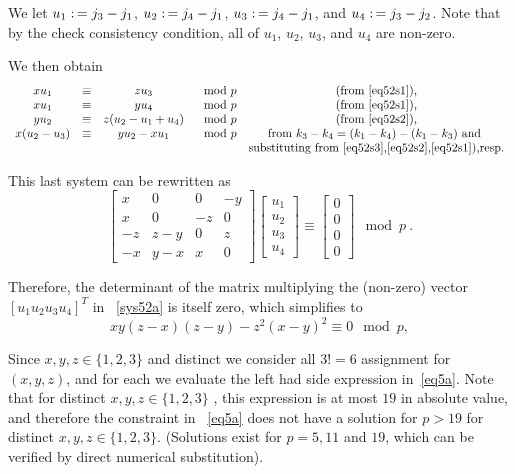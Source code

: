  We let $u_1 \asn j_3 -j_1$, $u_2\asn j_4 -j_1$, $u_3 \asn j_4
-j_1$, and $u_4 \asn j_3 -j_2$. Note that by the check consistency
condition, all of $u_1$, $u_2$, $u_3$, and $u_4$ are non-zero.

We then obtain
\begin{equation}\begin{array}{cccccc}
xu_1 &\equiv& zu_3 & \mod p & \text{(from \eqref{eq52s1}),} \\xu_1
&\equiv& yu_4 & \mod p & \text{(from \eqref{eq52s1}),}\\
yu_2 &\equiv& z(u_2-u_1+u_4)& \mod p & \text{(from \eqref{eq52s2}),}
\\x(u_2-u_3)
&\equiv& yu_2-xu_1 & \mod p & \text{from
$k_3-k_4=(k_1-k_4)-(k_1-k_3)$ and }\\{}&{}&{}&{}& \text{substituting
from \eqref{eq52s3},\eqref{eq52s2},\eqref{eq52s1}),resp.}
\end{array}\end{equation}

This last system can be rewritten as
\begin{equation}\label{sys52a}
\left[ \begin{array}{ccccccc} x & 0 & 0 & -y\\
x & 0 & -z &0\\
-z & z-y &0 & z\\
-x & y-x & x & 0
\end{array}\right] \left[\begin{array}{c}
u_1\\u_2\\u_3\\u_4 \end{array}\right] \equiv
\left[\begin{array}{c}0\\0\\0\\0\end{array}\right] \mod p~.
\end{equation}

Therefore, the determinant of the matrix multiplying the (non-zero)
vector $\left[u_1 u_2 u_3 u_4\right]^{T}$ in ~\eqref{sys52a} is
itself zero, which simplifies to
\begin{equation}\label{eq5a}
xy(z-x)(z-y)-z^2(x-y)^2 \equiv 0 \mod p,
\end{equation}

Since $x,y,z \in \{1,2,3\}$ and distinct we consider all $3!=6$
assignment for $(x,y,z)$, and for each we evaluate the left had side
expression in~\eqref{eq5a}. Note that for distinct $x,y,z \in
\{1,2,3\}$ , this expression is at most $19$ in absolute value, and
therefore the constraint in ~\eqref{eq5a} does not have a solution
for $p>19$ for distinct $x,y,z \in \{1,2,3\}$. (Solutions exist for
$p=5,11$ and $19$, which can be verified by direct numerical
substitution).

